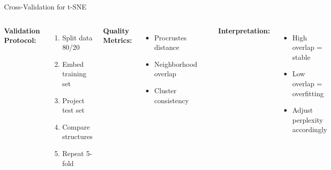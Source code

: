 \documentclass[aspectratio=169]{beamer}
\begin{document}
\begin{frame}{Cross-Validation for t-SNE}
\begin{columns}
\textbf{Validation Protocol:}
\begin{enumerate}
\item Split data 80/20
\item Embed training set
\item Project test set
\item Compare structures
\item Repeat 5-fold
\end{enumerate}

\textbf{Quality Metrics:}
\begin{itemize}
\item Procrustes distance
\item Neighborhood overlap
\item Cluster consistency
\end{itemize}

\includegraphics[width=\textwidth]{./Figures/cross_validation_tsne.png}

\textbf{Interpretation:}
\begin{itemize}
\item High overlap = stable
\item Low overlap = overfitting
\item Adjust perplexity accordingly
\end{itemize}
\end{columns}
\end{frame}
\end{document}
